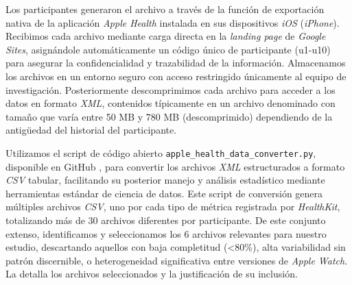 Los participantes generaron el archivo  a través de la función de exportación nativa de la aplicación \textit{Apple Health} instalada en sus dispositivos \textit{iOS} (\textit{iPhone}). Recibimos cada archivo mediante carga directa en la \textit{landing page} de \textit{Google Sites}, asignándole automáticamente un código único de participante (u1-u10) para asegurar la confidencialidad y trazabilidad de la información. Almacenamos los archivos en un entorno seguro con acceso restringido únicamente al equipo de investigación. Posteriormente descomprimimos cada archivo  para acceder a los datos en formato \textit{XML}, contenidos típicamente en un archivo denominado  con tamaño que varía entre 50 MB y 780 MB (descomprimido) dependiendo de la antigüedad del historial del participante.

Utilizamos el script de código abierto \texttt{apple\_health\_data\_converter.py}, disponible en GitHub \cite{Gaur2024AppleHealth}, para convertir los archivos \textit{XML} estructurados a formato \textit{CSV} tabular, facilitando su posterior manejo y análisis estadístico mediante herramientas estándar de ciencia de datos. Este script de conversión genera múltiples archivos \textit{CSV}, uno por cada tipo de métrica registrada por \textit{HealthKit}, totalizando más de 30 archivos diferentes por participante. De este conjunto extenso, identificamos y seleccionamos los 6 archivos relevantes para nuestro estudio, descartando aquellos con baja completitud (<80\%), alta variabilidad sin patrón discernible, o heterogeneidad significativa entre versiones de \textit{Apple Watch}. La  detalla los archivos seleccionados y la justificación de su inclusión.

